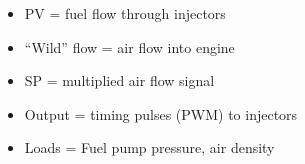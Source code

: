 





\begin{itemize}
\item{} PV = fuel flow through injectors
\item{} ``Wild'' flow = air flow into engine
\item{} SP = multiplied air flow signal
\item{} Output = timing pulses (PWM) to injectors
\item{} Loads = Fuel pump pressure, air density
\end{itemize}











